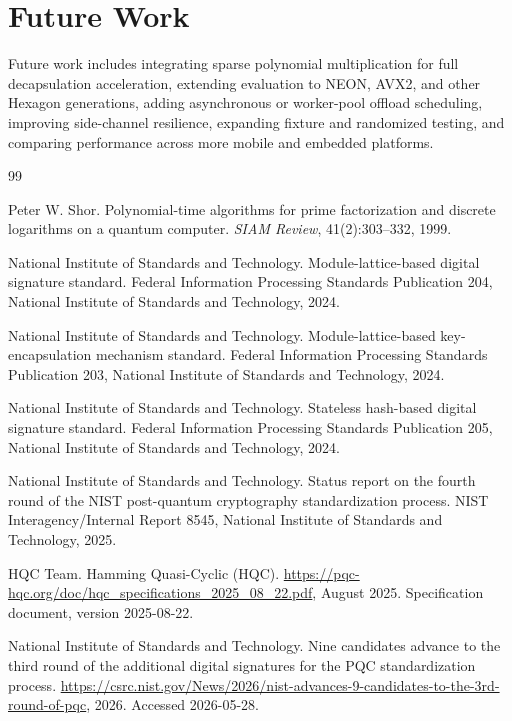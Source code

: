 \documentclass[12pt,a4paper]{report}
\begin{document}
\section{Future Work}
Future work includes integrating sparse polynomial multiplication for full decapsulation acceleration, extending evaluation to NEON, AVX2, and other Hexagon generations, adding asynchronous or worker-pool offload scheduling, improving side-channel resilience, expanding fixture and randomized testing, and comparing performance across more mobile and embedded platforms.

\begin{thebibliography}{99}

Peter W. Shor.
\newblock Polynomial-time algorithms for prime factorization and discrete logarithms on a quantum computer.
\newblock \emph{SIAM Review}, 41(2):303--332, 1999.

National Institute of Standards and Technology.
\newblock Module-lattice-based digital signature standard.
\newblock Federal Information Processing Standards Publication 204, National Institute of Standards and Technology, 2024.

National Institute of Standards and Technology.
\newblock Module-lattice-based key-encapsulation mechanism standard.
\newblock Federal Information Processing Standards Publication 203, National Institute of Standards and Technology, 2024.

National Institute of Standards and Technology.
\newblock Stateless hash-based digital signature standard.
\newblock Federal Information Processing Standards Publication 205, National Institute of Standards and Technology, 2024.

National Institute of Standards and Technology.
\newblock Status report on the fourth round of the NIST post-quantum cryptography standardization process.
\newblock NIST Interagency/Internal Report 8545, National Institute of Standards and Technology, 2025.

HQC Team.
\newblock Hamming Quasi-Cyclic (HQC).
\newblock \url{https://pqc-hqc.org/doc/hqc_specifications_2025_08_22.pdf}, August 2025. Specification document, version 2025-08-22.

National Institute of Standards and Technology.
\newblock Nine candidates advance to the third round of the additional digital signatures for the PQC standardization process.
\newblock \url{https://csrc.nist.gov/News/2026/nist-advances-9-candidates-to-the-3rd-round-of-pqc}, 2026. Accessed 2026-05-28.


\end{thebibliography}
\end{document}
